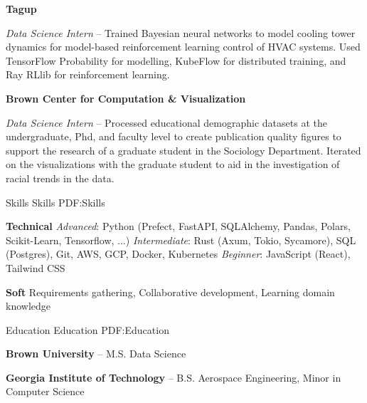 \documentclass[letterpaper,MMMyyyy,nonstopmode]{simpleresumecv}
\begin{document}
\begin{Body}
\BigGap

\Entry \textbf{Tagup}

\Gap

\BulletItem \textit{Data Science Intern}
\hfill
{} -- 
\SubBulletItem
Trained Bayesian neural networks to model cooling tower dynamics for model-based reinforcement learning control of HVAC systems. Used TensorFlow Probability for modelling, KubeFlow for distributed training, and Ray RLlib for reinforcement learning.

\BigGap

\Entry \textbf{Brown Center for Computation \& Visualization}

\Gap
  
\BulletItem \textit{Data Science Intern}
\hfill
{} -- 
\SubBulletItem
Processed educational demographic datasets at the undergraduate, Phd, and faculty level to create publication quality figures to support the research of a graduate student in the Sociology Department. Iterated on the visualizations with the graduate student to aid in the investigation of racial trends in the data.



\Section
{Skills}
{Skills}
{PDF:Skills}

\Entry \textbf{Technical}
\BulletItem \textit{Advanced}: Python (Prefect, FastAPI, SQLAlchemy, Pandas, Polars, Scikit-Learn, Tensorflow, ...)
\BulletItem \textit{Intermediate}: Rust (Axum, Tokio, Sycamore), SQL (Postgres), Git, AWS, GCP, Docker, Kubernetes
\BulletItem \textit{Beginner}: JavaScript (React), Tailwind CSS

\BigGap

\Entry \textbf{Soft}
\BulletItem Requirements gathering, Collaborative development, Learning domain knowledge

\Section
{Education}
{Education}
{PDF:Education}

\Entry \textbf{Brown University}
\hfill
{} -- 
\BulletItem M.S. Data Science

\Entry \textbf{Georgia Institute of Technology}
\hfill
{} -- 
\BulletItem B.S. Aerospace Engineering, Minor in Computer Science


\end{Body}
\end{document}
